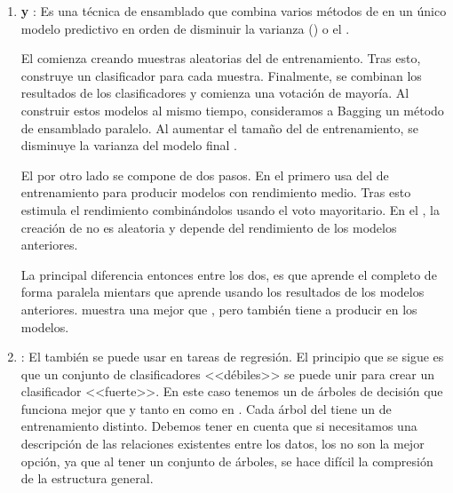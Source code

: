 \begin{enumerate}
\begin{algorithm}[H]

        \end{algorithm}

  \item \textbf{ y }: Es una técnica de ensamblado que combina varios métodos de  en un único modelo predictivo en orden de disminuir la varianza () o el .

        El  comienza creando muestras aleatorias del  de entrenamiento. Tras esto, construye un clasificador para cada muestra. Finalmente, se combinan los resultados de los clasificadores y comienza una votación de mayoría. Al construir estos modelos al mismo tiempo, consideramos a Bagging un método de ensamblado paralelo. Al aumentar el tamaño del  de entrenamiento, se disminuye la varianza del modelo final .

        El  por otro lado se compone de dos pasos. En el primero usa  del  de entrenamiento para producir modelos con rendimiento medio. Tras esto estimula el rendimiento combinándolos usando el voto mayoritario. En el , la creación de  no es aleatoria y depende del rendimiento de los modelos anteriores.

        La principal diferencia entonces entre los dos, es que  aprende el  completo de forma paralela mientars que  aprende usando los resultados de los modelos anteriores.  muestra una mejor  que  , pero también tiene a producir  en los modelos.

  \item \textbf{}: El  también se puede usar en tareas de regresión. El principio que se sigue es que un conjunto de clasificadores <<débiles>> se puede unir para crear un clasificador <<fuerte>>. En este caso tenemos un  de árboles de decisión que funciona mejor que  y  tanto en  como en . Cada árbol del  tiene un  de entrenamiento distinto. Debemos tener en cuenta que si necesitamos una descripción de las relaciones existentes entre los datos, los  no son la mejor opción, ya que al tener un conjunto de árboles, se hace difícil la compresión de la estructura general.


\end{enumerate}
